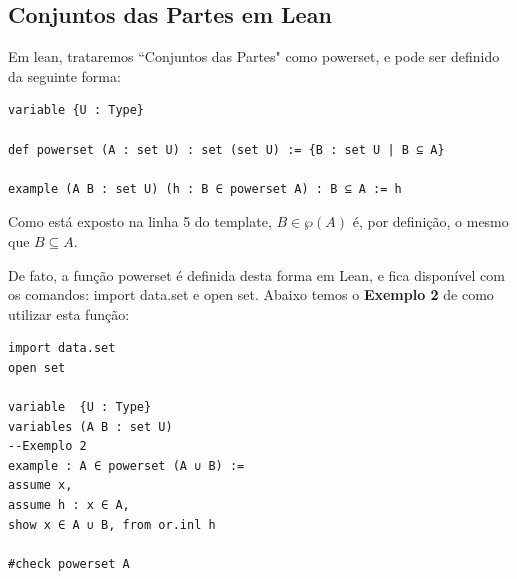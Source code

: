 \subsection{Conjuntos das Partes em Lean}
Em lean, trataremos ``Conjuntos das Partes" como {\selectfont powerset}, e pode ser definido da seguinte forma:
\begin{lstlisting}
variable {U : Type}

def powerset (A : set U) : set (set U) := {B : set U | B ⊆ A}

example (A B : set U) (h : B ∈ powerset A) : B ⊆ A := h \end{lstlisting}

Como está exposto na linha 5 do template, $B \in \wp(A)$ é, por definição, o mesmo que $B \subseteq A$.

De fato, a função {\selectfont powerset} é definida desta forma em Lean, e fica disponível com os comandos: {\selectfont import data.set} e {\selectfont open set}. Abaixo temos o \textbf{Exemplo 2} de como utilizar esta função:
\begin{lstlisting}
import data.set
open set

variable  {U : Type}
variables (A B : set U)
--Exemplo 2
example : A ∈ powerset (A ∪ B) :=
assume x,
assume h : x ∈ A,
show x ∈ A ∪ B, from or.inl h

#check powerset A \end{lstlisting}


